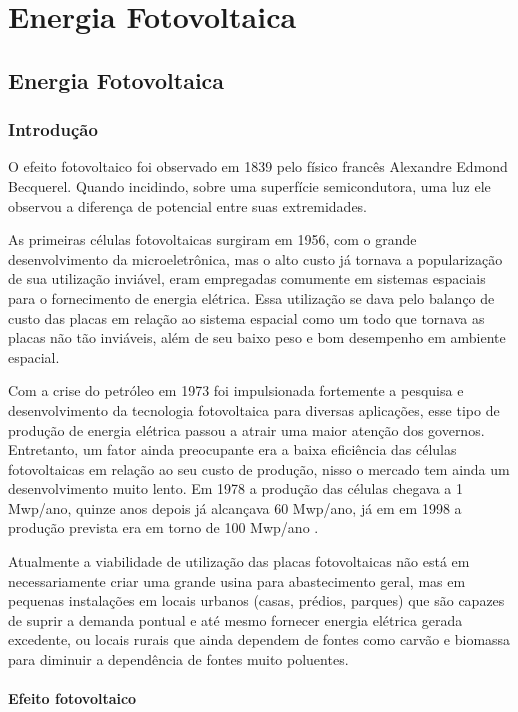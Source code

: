 \part{Energia Fotovoltaica}
\chapter[Energia Fotovoltaica]{Energia Fotovoltaica}

\section{Introdução}

O efeito fotovoltaico foi observado em 1839 pelo físico francês Alexandre Edmond Becquerel. Quando incidindo, sobre uma superfície semicondutora, uma luz ele observou a diferença de potencial entre suas extremidades.

As primeiras células fotovoltaicas surgiram em 1956, com o grande desenvolvimento da microeletrônica, mas o alto custo já tornava a popularização de sua utilização inviável, eram empregadas comumente em sistemas espaciais para o fornecimento de energia elétrica. Essa utilização se dava pelo balanço de custo das placas em relação ao sistema espacial como um todo que tornava as placas não tão inviáveis, além de seu baixo peso e bom desempenho em ambiente espacial.

Com a crise do petróleo em 1973 foi impulsionada fortemente a pesquisa e desenvolvimento da tecnologia fotovoltaica para diversas aplicações, esse tipo de produção de energia elétrica passou a atrair uma maior atenção dos governos. Entretanto, um fator ainda preocupante era a baixa eficiência das células fotovoltaicas em relação ao seu custo de produção, nisso o mercado tem ainda um desenvolvimento muito lento. Em 1978 a produção das células chegava a 1 Mwp/ano, quinze anos depois já alcançava 60 Mwp/ano, já em em 1998 a produção prevista era em torno de 100 Mwp/ano \cite{do2004principio}.

Atualmente a viabilidade de utilização das placas fotovoltaicas não está em necessariamente criar uma grande usina para abastecimento geral, mas em pequenas instalações em locais urbanos (casas, prédios, parques) que são capazes de suprir a demanda pontual e até mesmo fornecer energia elétrica gerada excedente, ou locais rurais que ainda dependem de fontes como carvão e biomassa para diminuir a dependência de fontes muito poluentes. 

\subsection{Efeito fotovoltaico}

